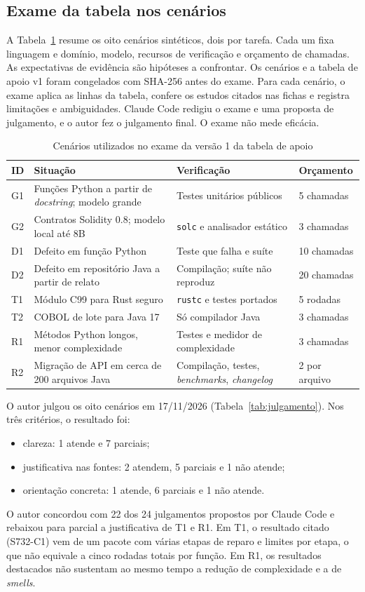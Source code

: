 \subsection{Exame da tabela nos cenários}\label{sec:exame}
A Tabela~\ref{tab:cenarios} resume os oito cenários sintéticos, dois por tarefa. Cada um fixa linguagem e domínio,
modelo, recursos de verificação e orçamento de chamadas. As expectativas de evidência são hipóteses a confrontar. Os
cenários e a tabela de apoio v1 foram congelados com SHA-256 antes do exame. Para cada cenário, o exame aplica as
linhas da tabela, confere os estudos citados nas fichas e registra limitações e ambiguidades. Claude Code redigiu o exame e uma proposta de julgamento, e o autor fez o julgamento final. O exame não mede eficácia.

\begin{table}[!t]
\caption{Cenários utilizados no exame da versão 1 da tabela de apoio}\label{tab:cenarios}
\centering\scriptsize
\setlength{\tabcolsep}{3pt}
\begin{tabular}{@{}p{0.55cm}p{3.2cm}p{2.4cm}p{1.3cm}@{}}
\hline
ID & Situação & Verificação & Orçamento\\
\hline
G1 & Funções Python a partir de \textit{docstring}; modelo grande & Testes unitários públicos & 5 chamadas\\
G2 & Contratos Solidity 0.8; modelo local até 8B & \texttt{solc} e analisador estático & 3 chamadas\\
D1 & Defeito em função Python & Teste que falha e suíte & 10 chamadas\\
D2 & Defeito em repositório Java a partir de relato & Compilação; suíte não reproduz & 20 chamadas\\
T1 & Módulo C99 para Rust seguro & \texttt{rustc} e testes portados & 5 rodadas\\
T2 & COBOL de lote para Java 17 & Só compilador Java & 3 chamadas\\
R1 & Métodos Python longos, menor complexidade & Testes e medidor de complexidade & 3 chamadas\\
R2 & Migração de API em cerca de 200 arquivos Java & Compilação, testes, \textit{benchmarks}, \textit{changelog} & 2 por arquivo\\
\hline
\end{tabular}
\end{table}

O autor julgou os oito cenários em 17/11/2026 (Tabela~\ref{tab:julgamento}). Nos três critérios, o resultado foi:
\begin{itemize}
  \item clareza: 1 atende e 7 parciais;
  \item justificativa nas fontes: 2 atendem, 5 parciais e 1 não atende;
  \item orientação concreta: 1 atende, 6 parciais e 1 não atende.
\end{itemize}
O autor concordou com 22 dos 24 julgamentos propostos por Claude Code e rebaixou para parcial a justificativa de
T1 e R1. Em T1, o resultado citado (S732-C1) vem de um pacote com várias etapas de reparo e limites por etapa, o
que não equivale a cinco rodadas totais por função. Em R1, os resultados destacados não sustentam ao mesmo tempo a
redução de complexidade e a de \textit{smells}.


